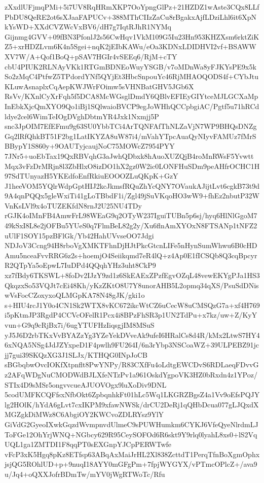 \documentclass[multi=frame]{standalone}
\begin{document}
\begin{world}
        zXxdlUFjmqPMi+5i7UV8RqHRmXKP7OoYpngGlPz+21HZDZ1wAste3CQx8LLfPbDU8QeRE2ot6sXJaaFAPUCv+388MThCIIzZaCu8rBgakxAjfLDziLhl6it6XpNkYsWD+XXdCVZWcVxBV6/dH7g7IqtRJhR1NYMq
        Gijnmg4GVV+09fBN3PfonlJ2s56CwHqv1VkM109G5Iu23Hn953KHZXsm6rktZiKZ5+xrHDZLvm6K4n5Sgei+nqK2jEIbKAWu/eOa3KDNxLDIDHVI2vf+BSAWWXV7W/A+Qof1BoQ+pSAV7HGIr4vSEEq6/RjM+cTY
        cbU4PIUK2RLNAyVKk1RTGmBDNEoWuyYSGB/v7oMDnWa8yFJKYsPE9x5kSo2zMqC4PtfwZ5TPdordYNf5QYjEt3HbcSnpouYc46RjMHAOQODS4f+CYbJtuKLuwAsnaplxCqAepKWJWrFOimw5sVHNBatGHV5JGb6X
        RsVv/KXnlCyXrFqh5f5DCA8McWGsglDmdY6QBlvEFIEyGIYtceMJLGCXaMpInEbkXjcQmXYO9Qo1iBj1SQlwaioBVCP9egJoWHhQCCpbgiAC/Pgtf5u71hRCdldye2cel6WimTeIOgDVghDbtmYR4Jxk1Nxmjj5P
        snc3JpOIM7EfEFmu9g63SU0YbbTCi4ArTQNFAfThNLZaVjN7WP9BHQsDNZgGq2lRfQhkBT51F2bg1LatIKYZA8uW87i4/mVahYTpcAuaQyNIyvFAMUz7fMrSBBypY1S860y+9OAUTyjcaujNoC75MOWcZ7954PYY
        7JNr5+uoEbTax19QxRBVqhG3aJwhQDbxk8hAuoXUZQjB4roMnRWsF5YvwttMqx3vFzDrMRjn8l3ZbHlxO8izDO1hX2gz0W2ic0LONFHuSDm9peAHfrOCHC1H97SdTUnyazH5YKEdfoEnfRkiuEOOOZLuQKpK+GzY
        J1heeVOM5YQlrWdpGptHIJ2kcJkmsfRQuZhYcQNY7OVaukAJijtLvt6cgkB73t9d9A4qnPQQx5gleWxiTi41gLoTBbdF1i/Zgl49jSuVKqoHO3wW9+fhEz2nbutP32WVnKsLVl9x4oTUZEKfdN8rnJ2U25NU4TDy
        rGJK4oIMnFB4AmwFrL98WEaG9q2OTyW237IguiTUBn5p6sj/hyq6HlNlGgoM749kSxI8L8e2jOFBu5YUeS0q7FlmBeL82g2y/Xu6flnAmXYOxN8FTSANp1tNFZ2uUlF1SOY15pzBFlGk/Yb42HahUVvseOO7Jdgi
        NDJoV3Ccng94H8rboVgXMKTFhnDjHJtPkcGtcnLIFe5nHynSumWhwu6B0cHDAmu5nceaFvvRRG6z2s+hoemjO4Seiikqmd7eR4lQ+z4Ap0E1fICSQb8Q3cqBpcyrR2QTpYa5oEpwL7IuDPd4QQqhYHz3uht8CkP9
        xz7fBdy6TKSWL+8foDv2IJzY9zd1z6SkEAExZPzfEgvOZqL48vewEKYgPJa1HS3QkqzxSo53VQJt7cEi48Kh/yKzZKtO8U7Y8unorAHB5L2opmq34qXS/PsuSdDNiswVsFocCZoxyxoQLMGpKA78N48gJK/gki1o
        s+HIU4rcJ1Y0o4CN1Sk2WTX8vKC672ikcWtCZ6uCecW8uCMSQzG7a+xf4H769i5pKtmJP3RgdP4CCVcOFelR1Pcx4i8BPzFhSR3p1UN2TdPu+x7kz/uw+Z/KyYvun+G9q9cRjBx7i/6ugYTUFHzIiqsgjIM8MSuS
        yJ5J6D2rbTKxVvBYAZzYg3YZeYekDVveAk9ufeI6HRalCs8d4R/kMx2LtwS7HY46xNQA5NSg4JdJZYxpeD1F4pwlh9FU264I/6n3rYbp3NSCoaWZ+39ULPEBZ91jcjj7gui39SKQzXG3J1SLJx/KTHQG0INpJoCB
        sBGbqbwOvcIOKfXtpnflt8PwYNPy/R83CXfFu4oLdtgEWCDvS6RDLaeqFDvvGz2AFqWDgNuCMODWdBJLXfeNTzPv1a961OskdYgpoVK3HZ0bRxdn4z1YPoz/STIx4D9sMSr5ongvvcueAJUOVOgx9luXoDiv9DNL
        5codUMFKCQFfsxNfbOkt6ZpbqnhkFt01hLc5Wq1LKGRZBgsZ4a1Vv9oEfsPQJYlg2HOlK/hYdA6gLvt7cxIKPM9xfawNWSk/drCU2DeRj1qQHbDcua077gLJQxdXMGZgkDiMWz8C6AbgiOY2KWCvoZDLRYsz9YlY
        GiVdG2GyeoIXwkGqzdWvmpnvdUlmeC9sPUWHumkm6CYKJ6VfeQyeNlrdmLJToFGe12OhYrjWNQ+NGbcy629R95CeySOFOd6R6skt9Y9rlq0lyahL8xs0+lS2VqUQL1ga1ZMTDI1F8qqPT0sEXGnpYJCpPERWTwfe
        vFcP3xK5Hgq8pKz8ETfsp63ABqAxMaiJrHL2Xl838ZcttdT1PerqTfnBoXgmOphxjsjQG5ROhlUD+p+9nuqI18AYY0mGFgPm+7fpjWYGYX/vPTmcOPlcZ+/ava9u/Jq4+oQXXJofrBDmTw/mYV0jWgRTWoTc/Rfu

\end{world}
\end{document}

